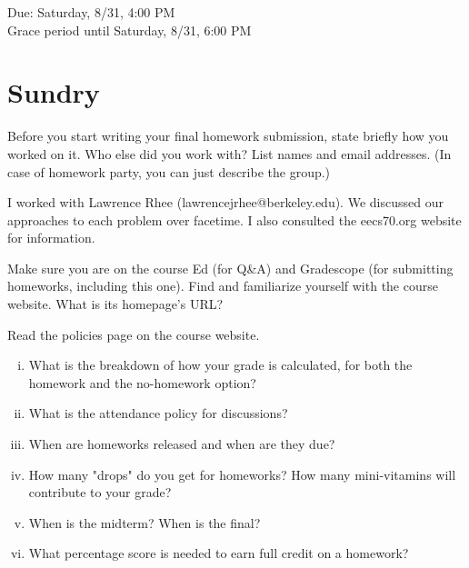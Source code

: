 \documentclass[11pt]{article}
\begin{document}
\maketitle
\fontsize{12}{15}\selectfont

\begin{center}
    Due: Saturday, 8/31, 4:00 PM \\
    Grace period until Saturday, 8/31, 6:00 PM \\
\end{center}

\section*{Sundry}
Before you start writing your final homework submission, state briefly how you worked on it.  Who else did you work with?  List names and email addresses.  (In case of homework party, you can just describe the group.)

\begin{solution}
  I worked with Lawrence Rhee (lawrencejrhee@berkeley.edu). 
  We discussed our approaches to each problem over facetime. 
  I also consulted the eecs70.org website for information. 
\end{solution}

\vspace{15pt}


\begin{Parts}

\Part Make sure you are on the course Ed (for Q\&A) and Gradescope (for submitting homeworks, including this one). Find and familiarize yourself with the course website. What is its homepage's URL?

\Part Read the policies page on the course website.
	\begin{enumerate}[(i)]  
		\item What is the breakdown of how your grade is calculated, for both the homework and the no-homework option?
		\item What is the attendance policy for discussions?
		\item When are homeworks released and when are they due?
		\item How many "drops" do you get for homeworks? How many mini-vitamins will contribute to your grade?
		\item When is the midterm? When is the final?
        \item What percentage score is needed to earn full credit on a homework?
	\end{enumerate}

\end{Parts}
\end{document}
